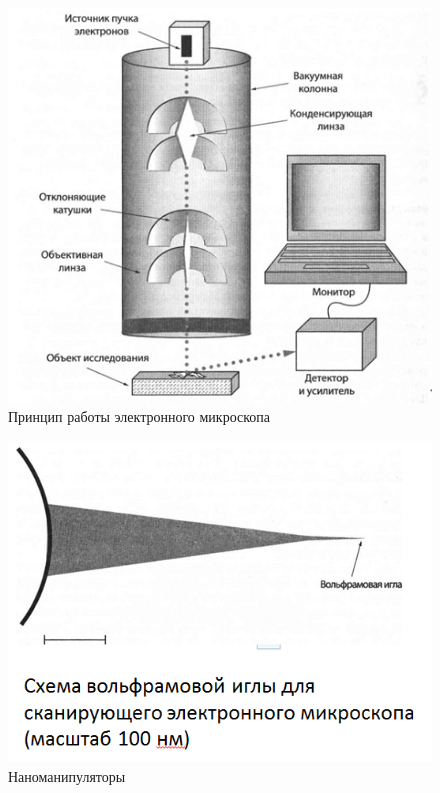 \documentclass[_Venture_p3.tex]{subfiles}
\begin{document}
\begin{frame}
\begin{figure}
	\centering
	\includegraphics[scale=.6]{img/electronic_microscope}
	\caption{Принцип работы электронного микроскопа}
\end{figure}
\end{frame}

\begin{frame}
\begin{figure}
	\centering
	\includegraphics[scale=.7]{img/nanomanipulator}
	\caption{Наноманипуляторы}
\end{figure}
\end{frame}
\end{document}
